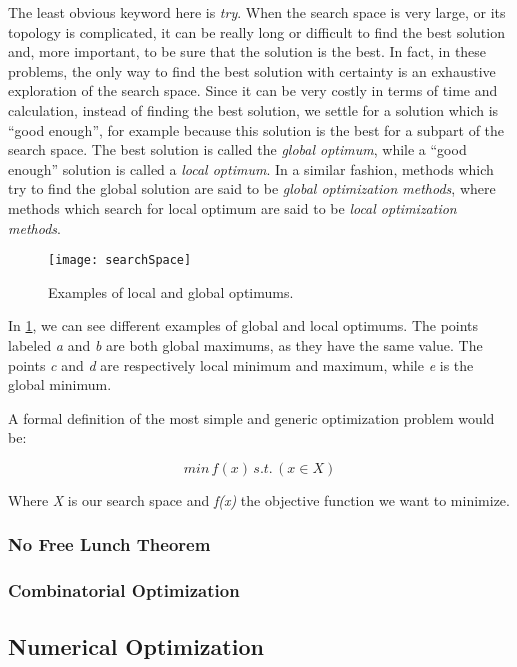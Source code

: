 The least obvious keyword here is \emph{try}. When the search space is very large, or its topology is complicated, it can be really long or difficult to find the best solution and, more important, to be sure that the solution is the best. In fact, in these problems, the only way to find the best solution with certainty is an exhaustive exploration of the search space. Since it can be very costly in terms
of time and calculation, instead of finding the best solution, we settle for a solution which is {}``good enough'', for example because this solution is the best for a subpart of the search space. The best solution is called the \emph{global optimum}, while a {}``good enough'' solution is called a \emph{local optimum}. In a similar fashion, methods which try to find the global solution are said to be \emph{global optimization methods}, where methods which search for local optimum are said to be \emph{local optimization methods}.

\begin{figure}
\centering
\texttt{[image: searchSpace]}
\caption{Examples of local and global optimums.}
\label{localAndGlobalOptims}
\end{figure}


In \ref{localAndGlobalOptims}, we can see different examples of global and local optimums. The points labeled \emph{a} and \emph{b} are both global maximums, as they have the same value. The points
\emph{c} and \emph{d} are respectively local minimum and maximum, while \emph{e} is the global minimum.

A formal definition of the most simple and generic optimization problem would be:

\begin{equation}
min\, f(x)\, s.t.\,(x\in X)
\end{equation}

Where \emph{X} is our search space and \emph{f(x)} the objective function we want to minimize. 

\subsubsection{No Free Lunch Theorem}

\subsubsection{Combinatorial Optimization}

\subsection{Numerical Optimization}
